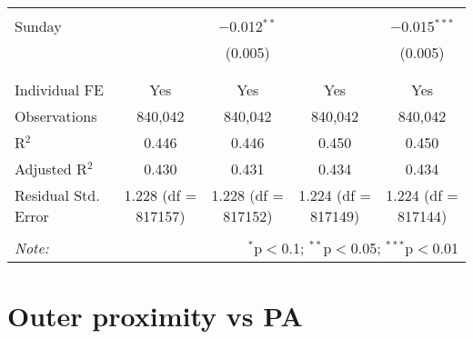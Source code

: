 \documentclass[
]{article}
\begin{document}
\begin{table}[!htbp]
{\begin{tabular}{@{\extracolsep{5pt}}lcccc}
  & & & & \\ 
 Sunday &  & $-$0.012$^{**}$ &  & $-$0.015$^{***}$ \\ 
  &  & (0.005) &  & (0.005) \\ 
  & & & & \\ 
\hline \\[-1.8ex] 
Individual FE & Yes & Yes & Yes & Yes \\ 
Observations & 840,042 & 840,042 & 840,042 & 840,042 \\ 
R$^{2}$ & 0.446 & 0.446 & 0.450 & 0.450 \\ 
Adjusted R$^{2}$ & 0.430 & 0.431 & 0.434 & 0.434 \\ 
Residual Std. Error & 1.228 (df = 817157) & 1.228 (df = 817152) & 1.224 (df = 817149) & 1.224 (df = 817144) \\ 
\hline 
\hline \\[-1.8ex] 
\textit{Note:}  & \multicolumn{4}{r}{$^{*}$p$<$0.1; $^{**}$p$<$0.05; $^{***}$p$<$0.01} \\ 
\end{tabular}
} 
\end{table} 
\newpage
\section{Outer proximity vs PA}
\end{document}
